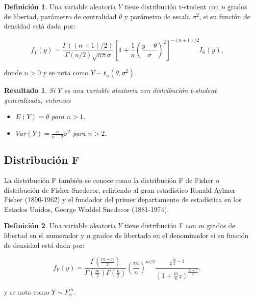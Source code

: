 \documentclass[
  10pt,
  spanish,
]{book}
\providecommand{\tightlist}{%
  \setlength{\itemsep}{0pt}\setlength{\parskip}{0pt}}
\newtheorem{proposition}{Resultado}[chapter]
\theoremstyle{definition}
\newtheorem{definition}{Definición}[chapter]
\theoremstyle{definition}
\theoremstyle{definition}
\theoremstyle{definition}
\theoremstyle{remark}
\begin{document}
\begin{definition}
\protect\hypertarget{def:unnamed-chunk-46}{}{\label{def:unnamed-chunk-46} }Una variable aleatoria \(Y\) tiene distribución t-student con \(n\) grados de libertad, parámetro de centralidad \(\theta\) y parámetro de escala \(\sigma^2\), si su función de densidad está dada por:

\begin{equation}
f_Y(y)=\frac{\Gamma((n+1)/2)}{\Gamma(n/2)\sqrt{n\pi}\sigma}\left[1+\frac{1}{n}\left(\frac{y-\theta}{\sigma}\right)^2\right]^{-(n+1)/2}
I_\mathbb{R}(y),
\end{equation}

donde \(n>0\) y se nota como \(Y\sim t_n(\theta,\sigma^2)\).
\end{definition}

\begin{proposition}
\protect\hypertarget{prp:unnamed-chunk-47}{}{\label{prp:unnamed-chunk-47} }Si \(Y\) es una variable aleatoria con distribución t-student generalizada, entonces

\begin{itemize}
\tightlist
\item
  \(E(Y)=\theta\) para \(n>1\).
\item
  \(Var(Y)=\frac{n}{n-2}\sigma^2\) para \(n>2\).
\end{itemize}
\end{proposition}

\hypertarget{distribuciuxf3n-f}{%
\subsection{Distribución F}\label{distribuciuxf3n-f}}

La distribución F también se conoce como la distribución F de Fisher o distribución de Fisher-Snedecor, refiriendo al gran estadístico Ronald Aylmer Fisher (1890-1962) y el fundador del primer departamento de estadística en los Estados Unidos, George Waddel Snedecor (1881-1974).

\begin{definition}
\protect\hypertarget{def:unnamed-chunk-48}{}{\label{def:unnamed-chunk-48} }Una variable aleatoria \(Y\) tiene distribución F con \(m\) grados de libertad en el numerador y \(n\) grados de libertado en el denominador si su función de densidad está dada por:

\begin{equation}
f_Y(y)=\frac{\Gamma(\frac{m+n}{2})}{\Gamma(\frac{m}{2})\Gamma(\frac{n}{2})}\left(\frac{m}{n}\right)^{m/2}\frac{z^{\frac{m}{2}-1}}{\left(1+\frac{m}{n}z\right)^{\frac{m+n}{2}}},
\end{equation}

y se nota como \(Y\sim F^m_n\).
\end{definition}
\end{document}
